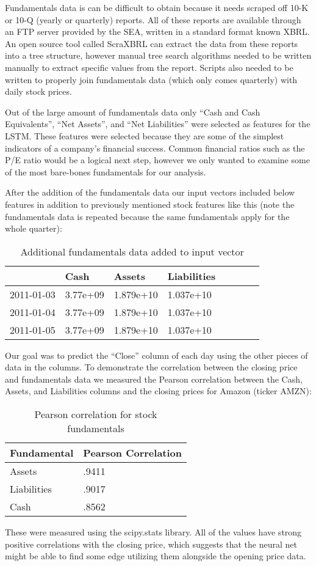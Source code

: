 \documentclass{article}
\begin{document}
Fundamentals data is can be difficult to obtain because it needs scraped off 10-K or 10-Q (yearly or quarterly) reports. All of these reports are available through an FTP server provided by the SEA, written in a standard format known XBRL. An open source tool called ScraXBRL can extract the data from these reports into a tree structure, however manual tree search algorithms needed to be written manually to extract specific values from the report. Scripts also needed to be written to properly join fundamentals data (which only comes quarterly) with daily stock prices. 

Out of the large amount of fundamentals data only “Cash and Cash Equivalents”, “Net Assets”, and “Net Liabilities” were selected as features for the LSTM. These features were selected because they are some of the simplest indicators of a company's financial success. Common financial ratios such as the P/E ratio would be a logical next step, however we only wanted to examine some of the most bare-bones fundamentals for our analysis. 

After the addition of the fundamentals data our input vectors included below features in addition to previously mentioned stock features like this (note the fundamentals data is repeated because the same fundamentals apply for the whole quarter):
\begin{table}[H]
\centering
\begin{tabular}{|l|l|l|l|l|l|l|l|}
\hline
 & Cash & Assets & Liabilities \\ \hline
2011-01-03 & 3.77e+09 & 1.879e+10 & 1.037e+10 \\ \hline
2011-01-04 & 3.77e+09 & 1.879e+10 & 1.037e+10 \\ \hline
2011-01-05 & 3.77e+09 & 1.879e+10 & 1.037e+10 \\ \hline
\end{tabular}
\caption{Additional fundamentals data added to input vector}
\end{table}

Our goal was to predict the “Close” column of each day using the other pieces of data in the columns. To demonstrate the correlation between the closing price and fundamentals data we measured the Pearson correlation between the Cash, Assets, and Liabilities columns and the closing prices for Amazon (ticker AMZN):
\begin{table}[H]
\centering
\begin{tabular}{|l|l|}
\hline
Fundamental & Pearson Correlation \\ \hline
Assets      & .9411               \\ \hline
Liabilities & .9017               \\ \hline
Cash        & .8562               \\ \hline
\end{tabular}
\caption{Pearson correlation for stock fundamentals}
\label{my-label}
\end{table}
These were measured using the scipy.stats library. All of the values have strong positive correlations with the closing price, which suggests that the neural net might be able to find some edge utilizing them alongside the opening price data. 
\end{document}
